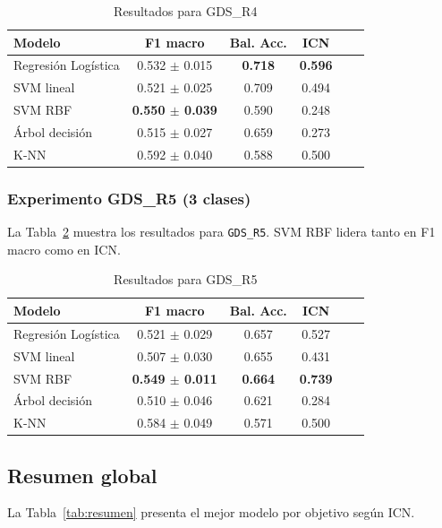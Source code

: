 \documentclass[conference]{IEEEtran}
\begin{document}
\begin{table}[h]
\centering
\caption{Resultados para GDS\_R4}
\label{tab:gds_r4}
\begin{tabular}{lccccc}
\toprule
\textbf{Modelo} & \textbf{F1 macro} & \textbf{Bal. Acc.} & \textbf{ICN} \\
\midrule
Regresión Logística & 0.532 $\pm$ 0.015 & \textbf{0.718} & \textbf{0.596} \\
SVM lineal & 0.521 $\pm$ 0.025 & 0.709 & 0.494 \\
SVM RBF & \textbf{0.550 $\pm$ 0.039} & 0.590 & 0.248 \\
Árbol decisión & 0.515 $\pm$ 0.027 & 0.659 & 0.273 \\
K-NN & 0.592 $\pm$ 0.040 & 0.588 & 0.500 \\
\bottomrule
\end{tabular}
\end{table}

\subsubsection*{Experimento GDS\_R5 (3 clases)}
La Tabla~\ref{tab:gds_r5} muestra los resultados para \texttt{GDS\_R5}. SVM RBF lidera tanto en F1 macro como en ICN.

\begin{table}[h]
\centering
\caption{Resultados para GDS\_R5}
\label{tab:gds_r5}
\begin{tabular}{lccccc}
\toprule
\textbf{Modelo} & \textbf{F1 macro} & \textbf{Bal. Acc.} & \textbf{ICN} \\
\midrule
Regresión Logística & 0.521 $\pm$ 0.029 & 0.657 & 0.527 \\
SVM lineal & 0.507 $\pm$ 0.030 & 0.655 & 0.431 \\
SVM RBF & \textbf{0.549 $\pm$ 0.011} & \textbf{0.664} & \textbf{0.739} \\
Árbol decisión & 0.510 $\pm$ 0.046 & 0.621 & 0.284 \\
K-NN & 0.584 $\pm$ 0.049 & 0.571 & 0.500 \\
\bottomrule
\end{tabular}
\end{table}

\subsection{Resumen global}
La Tabla~\ref{tab:resumen} presenta el mejor modelo por objetivo según ICN.
\end{document}
